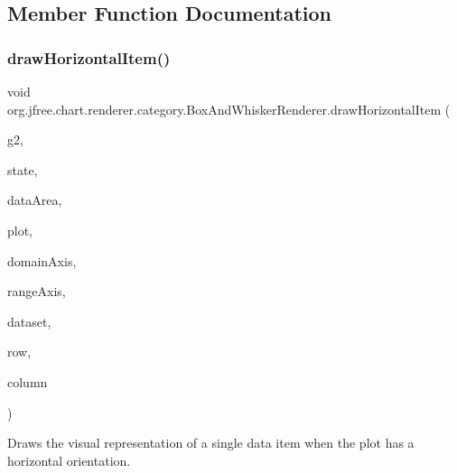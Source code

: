\subsection{Member Function Documentation}
\mbox{\label{classorg_1_1jfree_1_1chart_1_1renderer_1_1category_1_1_box_and_whisker_renderer_aaeb4e1297257467659547402f45c03e6}} 
\subsubsection{\texorpdfstring{draw\+Horizontal\+Item()}{drawHorizontalItem()}}
{\footnotesize\ttfamily void org.\+jfree.\+chart.\+renderer.\+category.\+Box\+And\+Whisker\+Renderer.\+draw\+Horizontal\+Item (\begin{DoxyParamCaption}\item[{Graphics2D}]{g2,  }\item[{\mbox{\hyperlink{classorg_1_1jfree_1_1chart_1_1renderer_1_1category_1_1_category_item_renderer_state}{Category\+Item\+Renderer\+State}}}]{state,  }\item[{Rectangle2D}]{data\+Area,  }\item[{\mbox{\hyperlink{classorg_1_1jfree_1_1chart_1_1plot_1_1_category_plot}{Category\+Plot}}}]{plot,  }\item[{\mbox{\hyperlink{classorg_1_1jfree_1_1chart_1_1axis_1_1_category_axis}{Category\+Axis}}}]{domain\+Axis,  }\item[{\mbox{\hyperlink{classorg_1_1jfree_1_1chart_1_1axis_1_1_value_axis}{Value\+Axis}}}]{range\+Axis,  }\item[{\mbox{\hyperlink{interfaceorg_1_1jfree_1_1data_1_1category_1_1_category_dataset}{Category\+Dataset}}}]{dataset,  }\item[{int}]{row,  }\item[{int}]{column }\end{DoxyParamCaption})}

Draws the visual representation of a single data item when the plot has a horizontal orientation.



